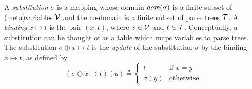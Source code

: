A \emph{substitution} \(\sigma\) is a mapping whose domain
\(\text{\it dom}(\sigma)\) is a finite subset of (meta)variables \({\cal V}\)
and the co\hyp{}domain is a finite subset of parse trees \({\cal
T}\). A \emph{binding} \(x \mapsto t\) is the pair \((x, t)\), where
\(x \in {\cal V}\) and \(t \in {\cal T}\). Conceptually, a
substitution can be thought of as a table which maps variables to
parse trees. The substitution \(\sigma \oplus x \mapsto t\) is the
\emph{update} of the substitution \(\sigma\) by the binding \(x
\mapsto t\), as defined by
\begin{equation}
(\sigma \oplus x \mapsto t)(y) \triangleq
\begin{cases}
  t         & \text{if} \; x = y\\
  \sigma(y) & \text{otherwise}
\end{cases}
\label{model:oplus}
\end{equation}
